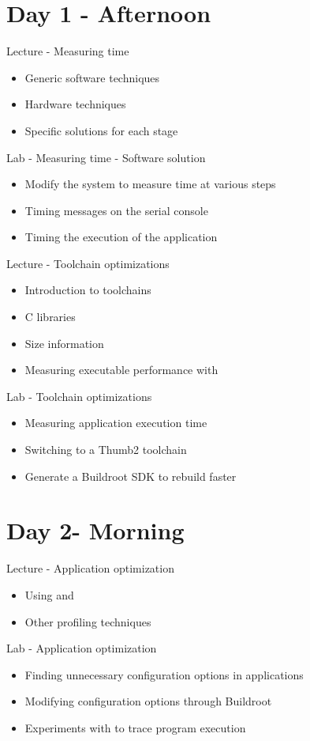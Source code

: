 \documentclass[a4paper,12pt,obeyspaces,spaces,hyphens]{article}
\begin{document}
\section{Day 1 - Afternoon}

\feagendatwocolumn
{Lecture - Measuring time}
{
  \begin{itemize}
  \item Generic software techniques
  \item Hardware techniques
  \item Specific solutions for each stage
  \end{itemize}
}
{Lab - Measuring time - Software solution}
{
 \begin{itemize}
 \item Modify the system to measure time at various steps
 \item Timing messages on the serial console
 \item Timing the execution of the application
 \end{itemize}
}

\feagendatwocolumn
{Lecture - Toolchain optimizations}
{
  \begin{itemize}
  \item Introduction to toolchains
  \item C libraries
  \item Size information
  \item Measuring executable performance with 
  \end{itemize}
}
{Lab - Toolchain optimizations}
{
  \begin{itemize}
  \item Measuring application execution time
  \item Switching to a Thumb2 toolchain
  \item Generate a Buildroot SDK to rebuild faster
  \end{itemize}
}

\section{Day 2- Morning}

\feagendatwocolumn
{Lecture - Application optimization}
{
  \begin{itemize}
  \item Using  and 
  \item Other profiling techniques
  \end{itemize}
}
{Lab - Application optimization}
{
 \begin{itemize}
 \item Finding unnecessary configuration options in applications
 \item Modifying configuration options through Buildroot
 \item Experiments with  to trace program execution
 \end{itemize}
}
\end{document}
